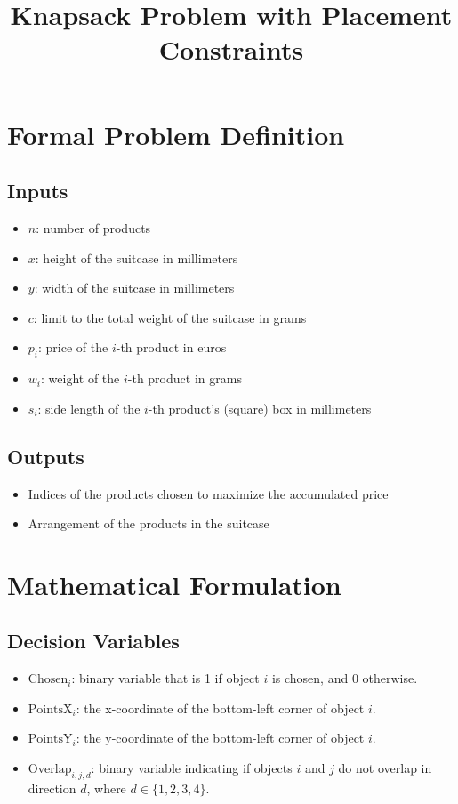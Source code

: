 \documentclass{article}
\title{Knapsack Problem with Placement Constraints}
\author{}
\date{}
\begin{document}
\maketitle

\section{Formal Problem Definition}

\subsection{Inputs}

\begin{itemize}
    \item $n$: number of products
    \item $x$: height of the suitcase in millimeters
    \item $y$: width of the suitcase in millimeters
    \item $c$: limit to the total weight of the suitcase in grams
    \item $p_i$: price of the $i$-th product in euros
    \item $w_i$: weight of the $i$-th product in grams
    \item $s_i$: side length of the $i$-th product's (square) box in millimeters
\end{itemize}

\subsection{Outputs}

\begin{itemize}
    \item Indices of the products chosen to maximize the accumulated price
    \item Arrangement of the products in the suitcase
\end{itemize}

\section{Mathematical Formulation}

\subsection{Decision Variables}

\begin{itemize}
    \item $\text{Chosen}_i$: binary variable that is 1 if object $i$ is chosen, and 0 otherwise.
    \item $\text{PointsX}_i$: the x-coordinate of the bottom-left corner of object $i$.
    \item $\text{PointsY}_i$: the y-coordinate of the bottom-left corner of object $i$.
    \item $\text{Overlap}_{i,j,d}$: binary variable indicating if objects $i$ and $j$ do not overlap in direction $d$, where $d \in \{1, 2, 3, 4\}$.
\end{itemize}
\end{document}
